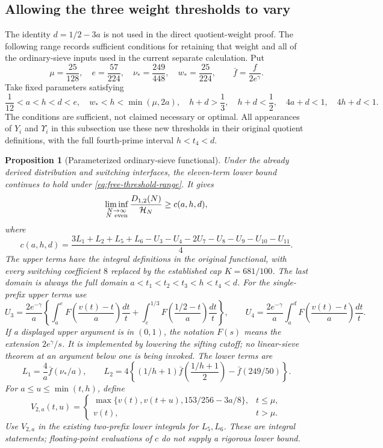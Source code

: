 \documentclass[11pt]{article}
\newtheorem{proposition}[theorem]{Proposition}
\newcommand{\HN}{\mathcal H_N}
\begin{document}
\subsection{Allowing the three weight thresholds to vary}
\label{sec:free-weight-thresholds}

The identity $d=1/2-3a$ is not used in the direct quotient-weight
proof. The following range records sufficient conditions for retaining
that weight and all of the ordinary-sieve inputs used in the current
separate calculation. Put
\[
 \mu=\frac{25}{128},\quad e=\frac{57}{224},\quad
 \nu_*=\frac{249}{448},\quad w_*=\frac{25}{224},
 \qquad \bar f=\frac{f}{2e^\gamma}.
\]
Take fixed parameters satisfying
\begin{equation}\label{eq:free-threshold-range}
 \frac1{12}<a<h<d<e,\quad w_*<h<\min(\mu,2a),\quad
 h+d>\frac13,\quad h+d<\frac12,\quad
 4a+d<1,\quad 4h+d<1.
\end{equation}
The conditions are sufficient, not claimed necessary or optimal.
All appearances of $Y_i$ and $\Upsilon_i$ in this subsection use these
new thresholds in their original quotient definitions, with the full
fourth-prime interval $h<t_4<d$.

\begin{proposition}[Parameterized ordinary-sieve functional]
\label{prop:free-weight-thresholds}
Under the already derived distribution and switching interfaces,
the eleven-term lower bound continues to hold under
\eqref{eq:free-threshold-range}. It gives
\[
 \liminf_{\substack{N\to\infty\\N\ {\rm even}}}
 \frac{D_{1,2}(N)}{\HN}\ge c(a,h,d),
\]
where
\[
 c(a,h,d)=\frac{3L_1+L_2+L_5+L_6-U_3-U_4
                 -2U_7-U_8-U_9-U_{10}-U_{11}}4.
\]
The upper terms have the integral definitions in the original functional,
with every switching coefficient $8$ replaced by the established cap
$K=681/100$. The last domain is always the full domain
$a<t_1<t_2<t_3<h<t_4<d$.
For the single-prefix upper terms use
\[
 U_3=\frac{2e^{-\gamma}}a
 \left\{\int_a^e F\left(\frac{v(t)-t}{a}\right)\frac{dt}{t}
       +\int_e^{1/3}F\left(\frac{1/2-t}{a}\right)\frac{dt}{t}\right\},
 \qquad
 U_4=\frac{2e^{-\gamma}}a
       \int_a^dF\left(\frac{v(t)-t}{a}\right)\frac{dt}{t}.
\]
If a displayed upper argument is in $(0,1)$, the notation $F(s)$
means the extension $2e^\gamma/s$. It is implemented by lowering the
sifting cutoff; no linear-sieve theorem at an argument below one is
being invoked.
The lower terms are
\[
 L_1=\frac4a\bar f(\nu_*/a),\qquad
 L_2=4\left\{(1/h+1)\bar f\left(\frac{1/h+1}{2}\right)
                         -\bar f(249/50)\right\}.
\]
For $a\le u\le\min(t,h)$, define
\[
 V_{2,a}(t,u)=
 \begin{cases}
 \max\{v(t),v(t+u),153/256-3a/8\},&t\le\mu,\\
 v(t),&t>\mu.
 \end{cases}
\]
Use $V_{2,a}$ in the existing two-prefix lower integrals for $L_5,L_6$.
These are integral statements; floating-point evaluations of $c$ do not
supply a rigorous lower bound.
\end{proposition}
\end{document}

